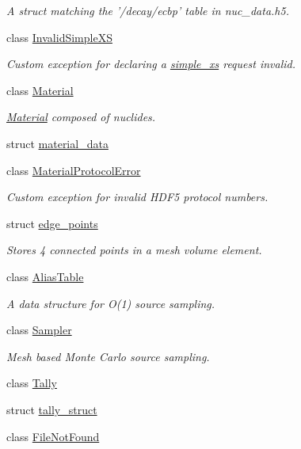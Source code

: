 \begin{DoxyCompactItemize}
\begin{DoxyCompactList}\small\item\em A struct matching the '/decay/ecbp' table in nuc\-\_\-data.\-h5. \end{DoxyCompactList}\item 
class \hyperlink{classpyne_1_1_invalid_simple_x_s}{Invalid\-Simple\-X\-S}
\begin{DoxyCompactList}\small\item\em Custom exception for declaring a \hyperlink{structsimple__xs}{simple\-\_\-xs} request invalid. \end{DoxyCompactList}\item 
class \hyperlink{classpyne_1_1_material}{Material}
\begin{DoxyCompactList}\small\item\em \hyperlink{classpyne_1_1_material}{Material} composed of nuclides. \end{DoxyCompactList}\item 
struct \hyperlink{structpyne_1_1material__data}{material\-\_\-data}
\item 
class \hyperlink{classpyne_1_1_material_protocol_error}{Material\-Protocol\-Error}
\begin{DoxyCompactList}\small\item\em Custom exception for invalid H\-D\-F5 protocol numbers. \end{DoxyCompactList}\item 
struct \hyperlink{structpyne_1_1edge__points}{edge\-\_\-points}
\begin{DoxyCompactList}\small\item\em Stores 4 connected points in a mesh volume element. \end{DoxyCompactList}\item 
class \hyperlink{classpyne_1_1_alias_table}{Alias\-Table}
\begin{DoxyCompactList}\small\item\em A data structure for O(1) source sampling. \end{DoxyCompactList}\item 
class \hyperlink{classpyne_1_1_sampler}{Sampler}
\begin{DoxyCompactList}\small\item\em Mesh based Monte Carlo source sampling. \end{DoxyCompactList}\item 
class \hyperlink{classpyne_1_1_tally}{Tally}
\item 
struct \hyperlink{structpyne_1_1tally__struct}{tally\-\_\-struct}
\item 
class \hyperlink{classpyne_1_1_file_not_found}{File\-Not\-Found}
\end{DoxyCompactItemize}
